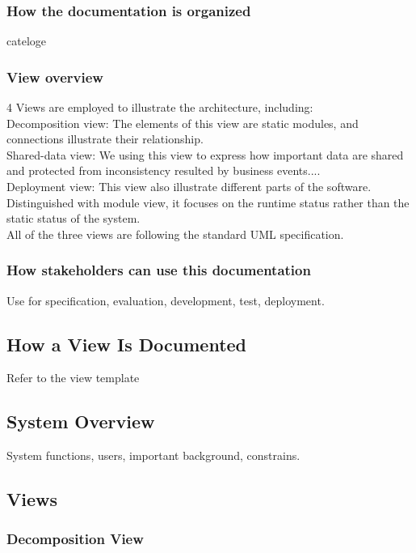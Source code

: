 \documentclass{article}
\begin{document}
	\subsubsection{How the documentation is organized}
	cateloge
	\subsubsection{View overview}
	4 Views are employed to illustrate the architecture, including:\\  
	Decomposition view: The elements of this view are static modules, and connections illustrate their relationship.\\  
	Shared-data view: We using this view to express how important data are shared and protected from inconsistency resulted by business events....  \\
	Deployment view: This view also illustrate different parts of the software. Distinguished with module view, it focuses on the runtime status rather than the static status of the system.\\
	All of the three views are following the standard UML specification.
	\subsubsection{How stakeholders can use this documentation}
	Use for specification, evaluation, development, test, deployment.

	\subsection{How a View Is Documented}
	Refer to the view template

	\subsection{System Overview}
	System functions, users, important background, constrains.
	
	\subsection{Views}
		\subsubsection{Decomposition View} 
\end{document}
